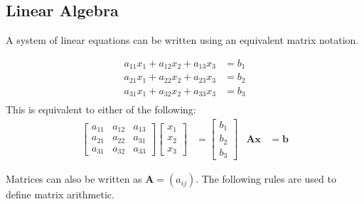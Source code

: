 \documentclass[crop=false,class=article,oneside]{standalone}
\begin{document}
    \subsection{Linear Algebra}
        A system of linear equations can be written
        using an equivalent matrix notation.
        \begin{example}
            \begin{align*}
                a_{11}x_{1}+a_{12}x_{2}+a_{13}x_{3}&=b_{1}\\
                a_{21}x_{1}+a_{22}x_{2}+a_{23}x_{3}&=b_{2}\\
                a_{31}x_{1}+a_{32}x_{2}+a_{33}x_{3}&=b_{3}\\
            \end{align*}
            This is equivalent to either of the following:
            \begin{align*}
                \begin{bmatrix}
                    a_{11}&a_{12}&a_{13}\\
                    a_{21}&a_{22}&a_{31}\\
                    a_{31}&a_{32}&a_{33}
                \end{bmatrix}
                \begin{bmatrix}
                    x_{1}\\
                    x_{2}\\
                    x_{3}
                \end{bmatrix}
                &=
                \begin{bmatrix}
                    b_{1}\\
                    b_{2}\\
                    b_{3}
                \end{bmatrix}
                &
                \mathbf{A}\mathbf{x}
                &=\mathbf{b}
            \end{align*}
        \end{example}
        Matrices can also be written as $\mathbf{A}=(a_{ij})$.
        The following rules are used to
        define matrix arithmetic.
\end{document}

